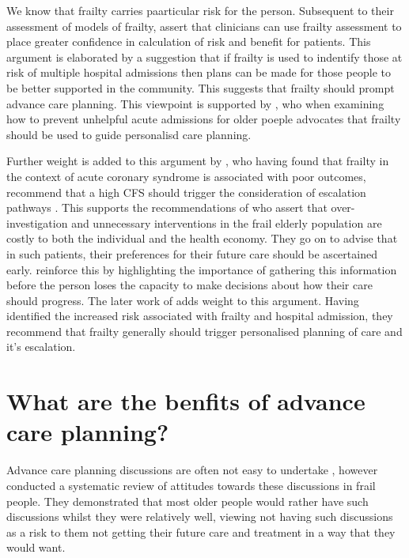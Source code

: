 \documentclass
[
	12pt,
	a4paper,
	oneside,
]{report}
\begin{document}
We know that frailty carries paarticular risk for the person. Subsequent to their
assessment of models of frailty, 
\textcite{martin:08} assert that clinicians can use frailty assessment to place 
greater confidence
in calculation of risk and benefit for patients. This argument is elaborated by 
a suggestion that if frailty is used to indentify those at risk of multiple 
hospital admissions then plans can be made for those people to be better
supported in the community. This suggests that frailty should prompt advance care
planning. This viewpoint is supported by 
\textcite{hunt:16}, who when examining how to prevent unhelpful acute admissions
for older poeple advocates that frailty should be used to guide personalisd 
care planning.

Further weight is added to this argument by \textcite{kang:15}, who having 
found that frailty in the 
context of acute coronary syndrome is associated
with poor outcomes, \textcite{kang:15} recommend that a high CFS should
trigger the consideration of escalation pathways \parencite{kang:15}.
This supports the recommendations of \textcite{silver:12} who assert that over-investigation
and unnecessary interventions in the frail elderly population are costly to both the
individual and the health economy. They go on to advise that in such patients, 
their preferences for their future care should be ascertained early. \textcite{oliver:14} 
reinforce this by highlighting the importance of gathering this information
before the person loses the capacity to make decisions about how their care should
progress. The later work of \textcite{romero-ortuno:16} adds weight to this argument.
Having identified the increased risk associated with frailty and hospital admission, 
they recommend that frailty generally should trigger personalised planning of
care and it's escalation.

\section{What are the benfits of advance care planning?}

Advance care planning discussions are often not easy to undertake 
\parencite{taylor:17}, however \textcite{sharp:13} conducted a systematic
review of attitudes towards these discussions in frail people. They 
demonstrated that most older people would rather have such discussions
whilst they were relatively well, viewing not having such discussions
as a risk to them not getting their future care and treatment in a way
that they would want.
\end{document}
